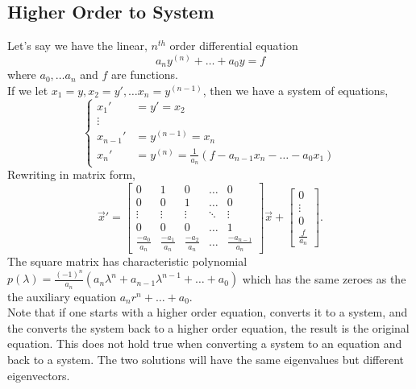 \subsection{Higher Order to System}
\noindent
Let's say we have the linear, $n^{th}$ order differential equation
\begin{equation*}
	a_ny^{(n)} + \ldots + a_0y = f
\end{equation*}
where $a_0, \ldots a_n$ and $f$ are functions.\\

\noindent
If we let $x_1 = y, x_2 = y', \ldots x_n = y^{(n-1)}$, then we have a system of equations,
\begin{equation*}
	\begin{cases}
		x_1' &= y' = x_2 \\
		\vdots \\
		x_{n-1}' &= y^{(n-1)} = x_n \\
		x_n' &= y^{(n)} = \frac{1}{a_n}\left(f - a_{n-1}x_n - \ldots - a_0x_1\right)
	\end{cases}
\end{equation*}
Rewriting in matrix form,
\begin{equation*}
	\vec{x}' = \begin{bmatrix}
		0 & 1 & 0 & \ldots & 0 \\
		0 & 0 & 1 & \ldots & 0 \\
		\vdots & \vdots	& \vdots & \ddots & \vdots \\
		0 & 0 & 0 & \ldots & 1 \\
		\frac{-a_0}{a_n} & \frac{-a_1}{a_n} & \frac{-a_2}{a_n} & \ldots & \frac{-a_{n-1}}{a_n} 
	\end{bmatrix} \vec{x} + \begin{bmatrix}
		0 \\
		\vdots \\
		0 \\
		\frac{f}{a_n}
	\end{bmatrix}.
\end{equation*}
The square matrix has characteristic polynomial $p(\lambda) = \frac{(-1)^{n}}{a_n}\left(a_n\lambda^n + a_{n-1}\lambda^{n-1} + \ldots + a_0\right)$ which has the same zeroes as the the auxiliary equation $a_nr^n + \ldots + a_0$.\\

\noindent
Note that if one starts with a higher order equation, converts it to a system, and the converts the system back to a higher order equation, the result is the original equation.
This does not hold true when converting a system to an equation and back to a system.
The two solutions will have the same eigenvalues but different eigenvectors.